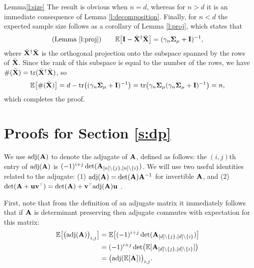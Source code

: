 \begin{proofof}{Lemma}{\ref{l:size}}
  The result is obvious when $n=d$, whereas
  for $n>d$ it is an immediate consequence
  of Lemma \ref{l:decomposition}.
  Finally, for $n<d$ the expected sample
  size follows as a corollary of Lemma \ref{l:proj}, which states that
  \begin{align*}
\text{(Lemma \ref{l:proj})} \qquad\mathbb E\big[\mathbf I - {\bar{\mathbf X}}^\dagger{\bar{\mathbf X}}\big] =
    (\gamma_n\mathbf{\Sigma}_\mu + \mathbf I)^{-1},
  \end{align*}
  where ${\bar{\mathbf X}}^\dagger{\bar{\mathbf X}}$ is the orthogonal projection onto
  the subspace spanned by the rows of ${\bar{\mathbf X}}$. Since the rank of this
  subspace is equal to the number of the rows, we have
  $\#({\bar{\mathbf X}})=\mathrm{tr}({\bar{\mathbf X}}^\dagger{\bar{\mathbf X}})$, so
  \begin{align*}
    \mathbb E\big[\#({\bar{\mathbf X}})\big] = d - \mathrm{tr}\big((\gamma_n\mathbf{\Sigma}_\mu +
    \mathbf I)^{-1}\big) =
    \mathrm{tr}\big(\gamma_n\mathbf{\Sigma}_\mu(\gamma_n\mathbf{\Sigma}_\mu+\mathbf I)^{-1}\big) = n,
  \end{align*}
  which completes the proof.
\end{proofof}

\section{Proofs for Section \ref{s:dp}}
\label{a:dp}

We use $\operatorname{\textnormal{adj}}(\mathbf A)$ to denote the adjugate of $\mathbf A$, defined as follows: the
$(i,j)$th entry of $\operatorname{\textnormal{adj}}(\mathbf A)$ is
$(-1)^{i+j}\det(\mathbf A_{[n]\backslash\{j\},[n]\backslash\{i\}})$.
We will use two useful identities related to the adjugate: (1)
$\operatorname{\textnormal{adj}}(\mathbf A)=\det(\mathbf A)\mathbf A^{-1}$ for invertible $\mathbf A$, and (2)
$\det(\A+\u\v^\top)=\det(\A)+\v^\top\!\adj(\A)\u$
\citep[see Fact 2.14.2 in][]{matrix-mathematics}.

First, note that from the definition of an adjugate matrix it immediately follows that if $\mathbf A$ is
determinant preserving then adjugate commutes with expectation for this matrix:
\begin{align}
  \mathbb E\big[\big(\!\operatorname{\textnormal{adj}}(\mathbf A)\big)_{i,j}\big] &=
  \mathbb E\big[(-1)^{i+j}\det(\mathbf A_{[d]\backslash\{j\},[d]\backslash\{i\}})\big]\nonumber
  \\
&=(-1)^{i+j}\det\!\big(\mathbb E[\mathbf A_{[d]\backslash\{j\},[d]\backslash\{i\}}]\big)
  \\
  &= \big(\!\operatorname{\textnormal{adj}}(\mathbb E[\mathbf A])\big)_{i,j}.\label{eq:adj}
\end{align}



